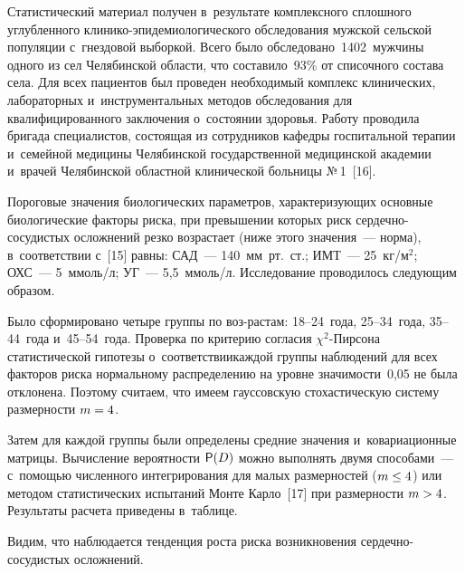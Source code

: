 \begin{multicols}{2}
Статистический 
материал получен в~результате комплексного сплош\-но\-го углуб\-лен\-но\-го  
кли\-ни\-ко-эпи\-де\-мио\-ло\-ги\-че\-ско\-го обследования муж\-ской сельской 
популяции с~гнез\-до\-вой выборкой. Всего было обследовано~1402~мужчины 
одного из сел Челябинской об\-ласти, что со\-ста\-ви\-ло~93\% от списочного со\-ста\-ва 
села. Для всех пациентов был проведен необходимый комплекс клинических, 
лабораторных и~инструментальных методов обследования для 
квалифицированного заключения о~со\-сто\-янии здоровья. Работу проводила 
бригада специалистов, со\-сто\-ящая из со\-труд\-ни\-ков ка\-фед\-ры госпитальной 
терапии и~семейной медицины Челябинской государственной медицинской 
академии и~врачей Челябинской об\-ласт\-ной клинической больницы №\,1~[16].
  
  Пороговые значения биологических па\-ра\-мет\-ров, характеризующих основ\-ные 
биологические фак\-то\-ры рис\-ка, при превышении которых риск 
сер\-деч\-но-со\-су\-ди\-стых 
ослож\-не\-ний резко воз\-рас\-та\-ет (ниже этого значения~--- норма), в~соответствии 
с~[15] рав\-ны: САД~--- 140~мм\ рт.\ ст.; ИМТ~--- 25~кг/м$^2$; ОХС~--- 
5~ммоль/л; УГ~--- 5,5~ммоль/л. 
Исследование проводилось сле\-ду\-ющим 
образом. 

Было сформировано четыре группы по воз-\linebreak рас\-там: 18--24~года,  
25--34~года, 35--44~года и~45--54~года. Проверка по критерию со\-гла\-сия 
\mbox{$\chi^2$-Пир}\-со\-на статистической гипотезы о~соответствии\linebreak каж\-дой группы 
наблюдений для всех фак\-то\-ров рис\-ка нормальному распределению на уровне 
зна\-чи\-мости~0,05 не была отклонена. Поэтому считаем, что имеем гауссовскую 
стохастическую сис\-те\-му раз\-мер\-ности $m\hm = 4$.
  
  Затем для каждой группы были определены средние значения 
и~ковариационные мат\-ри\-цы. Вы\-чис\-ле\-ние вероятности ${\sf P}(D)$ можно 
выполнять двумя способами~--- с~по\-мощью чис\-лен\-но\-го интегрирования для 
малых размерностей ($m\hm\leq 4$) или методом статистических испытаний  
Мон\-те Кар\-ло~[17] при раз\-мер\-ности $m\hm>4$. Результаты расчета 
приведены в~таб\-лице.



  
  Видим, что наблюдается тенденция рос\-та риска возникновения 
сердечно-сосудистых ослож\-не\-ний.\linebreak\vspace*{-12pt}

\vspace*{6pt}


\end{multicols}
